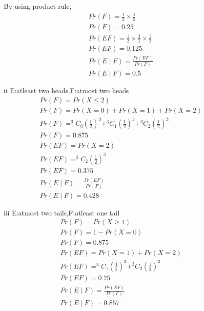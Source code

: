 \documentclass{article}
\begin{document}
\begin{enumerate}[label=13.\arabic{enumi}.\arabic{enumii}]
By using product rule,\\
\begin{align}
Pr(F)=\frac{1}{2}\times\frac{1}{2}\\
Pr(F)=0.25\\
Pr(EF)=\frac{1}{2}\times\frac{1}{2}\times\frac{1}{2}\\
Pr(EF)=0.125\\
Pr(E \mid F)=\frac{Pr(EF)}{Pr(F)}\\
Pr(E \mid F)=0.5
\end{align}
\item[ii] E:atleast two heads,F:atmost two heads\\
\begin{align}
Pr(F)=Pr(X\leq2)\\
Pr(F)=Pr(X=0)+Pr(X=1)+Pr(X=2)\\
Pr(F)=^{3}C_0 (\frac{1}{2})^{3}+ ^{3}C_1 (\frac{1}{2})^{3}+ ^{3}C_2 (\frac{1}{2})^{3}\\
Pr(F)=0.875\\
Pr(EF)=Pr(X=2)\\
Pr(EF)= ^{3}C_2 (\frac{1}{2})^{3}\\
Pr(EF)=0.375\\
Pr(E \mid F)=\frac{Pr(EF)}{Pr(F)}\\
Pr(E \mid F)=0.428
\end{align}
\item[iii]E:atmost two tails,F:atleast one tail\\
\begin{align}
Pr(F)=Pr(X\geq1)\\
Pr(F)=1-Pr(X=0)\\
Pr(F)=0.875\\
Pr(EF)=Pr(X=1)+Pr(X=2)\\
Pr(EF)=^{3}C_1 (\frac{1}{2})^{3}+^{3}C_2 (\frac{1}{2})^{3}\\
Pr(EF)=0.75\\
Pr(E \mid F)=\frac{Pr(EF)}{Pr(F)}\\
Pr(E \mid F)=0.857
\end{align}
\end{enumerate}
\end{document}
